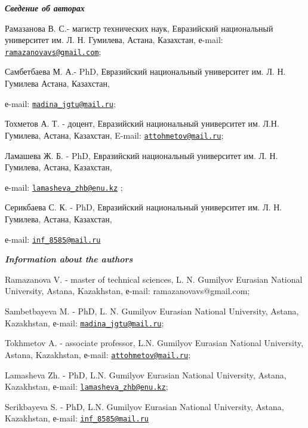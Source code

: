 \begin{authorinfo}
\hspace{1em}\emph{{\bfseries Сведение об авторах}}

Рамазанова В. С.- магистр технических наук, Евразийский национальный
университет им. Л. Н. Гумилева, Астана, Казахстан, е-mail:
\href{mailto:ramazanovavs@gmail.com}{\nolinkurl{ramazanovavs@gmail.com}};

Самбетбаева М. А.- PhD, Евразийский национальный университет им. Л. Н.
Гумилева Астана, Казахстан,

е-mail:
\href{mailto:madina_jgtu@mail.ru}{\nolinkurl{madina\_jgtu@mail.ru}};

Тохметов А. Т. - доцент, Евразийский национальный университет им. Л.Н.
Гумилева, Астана, Казахстан, E-mail:
\href{mailto:attohmetov@mail.ru}{\nolinkurl{attohmetov@mail.ru}};

Ламашева Ж. Б. - PhD, Евразийский национальный университет им. Л. Н.
Гумилева, Астана, Казахстан,

е-mail:
\href{mailto:lamasheva_zhb@enu.kz}{\nolinkurl{lamasheva\_zhb@enu.kz}} ;

Серикбаева С. К. - PhD, Евразийский национальный университет им. Л. Н.
Гумилева, Астана, Казахстан,

е-mail: \href{mailto:inf_8585@mail.ru}{\nolinkurl{inf\_8585@mail.ru}}

\hspace{1em}\emph{{\bfseries Information about the authors}}

Ramazanova V. - master of technical sciences, L. N. Gumilyov Eurasian
National University, Astana, Kazakhstan, е-mail: ramazanovavs@gmail.com;

Sambetbayeva M. - PhD, L. N. Gumilyov Eurasian National University,
Astana, Kazakhstan, е-mail:
\href{mailto:madina_jgtu@mail.ru}{\nolinkurl{madina\_jgtu@mail.ru}};

Tokhmetov A. - associate professor, L.N. Gumilyov Eurasian National
University, Astana, Kazakhstan, е-mail:
\href{mailto:attohmetov@mail.ru}{\nolinkurl{attohmetov@mail.ru}};

Lamasheva Zh. - PhD, L.N. Gumilyov Eurasian National University, Astana,
Kazakhstan, е-mail:
\href{mailto:lamasheva_zhb@enu.kz}{\nolinkurl{lamasheva\_zhb@enu.kz}};

Serikbayeva S. - PhD, L.N. Gumilyov Eurasian National University,
Astana, Kazakhstan, е-mail:
\href{mailto:inf_8585@mail.ru}{\nolinkurl{inf\_8585@mail.ru}}
\end{authorinfo}
